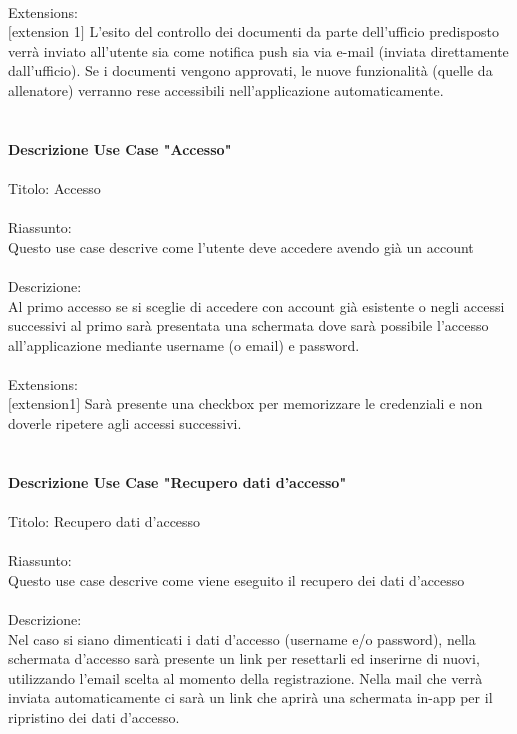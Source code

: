 \documentclass{article}
\begin{document}
\\
Extensions:\\
$[$extension 1$]$ L’esito del controllo dei documenti da parte dell’ufficio predisposto verrà inviato all’utente sia come notifica push sia
via e-mail (inviata direttamente dall’ufficio). Se i documenti vengono approvati, le nuove funzionalità (quelle da allenatore) verranno rese
accessibili nell’applicazione automaticamente.\\
\\
\\
\textbf{Descrizione Use Case "Accesso"}\\
\\
Titolo: Accesso\\
\\
Riassunto:\\
Questo use case descrive come l’utente deve accedere avendo già un account\\
\\
Descrizione:\\
Al primo accesso se si sceglie di accedere con account già esistente o negli accessi successivi al primo sarà presentata una schermata dove sarà
possibile l’accesso all’applicazione mediante username (o email) e password.\\
\\
Extensions:\\
$[$extension1$]$ Sarà presente una checkbox per memorizzare le credenziali e non doverle ripetere agli accessi successivi.\\
\\
\\
\textbf{Descrizione Use Case "Recupero dati d’accesso"}\\
\\
Titolo: Recupero dati d’accesso\\
\\
Riassunto:\\
Questo use case descrive come viene eseguito il recupero dei dati d’accesso\\
\\
Descrizione:\\
Nel caso si siano dimenticati i dati d’accesso (username e/o password), nella schermata d’accesso sarà presente un link per resettarli ed inserirne
di nuovi, utilizzando l’email scelta al momento della registrazione. Nella mail che verrà inviata automaticamente ci sarà un link che aprirà una
schermata in-app per il ripristino dei dati d’accesso.
\\
\\
\end{document}
